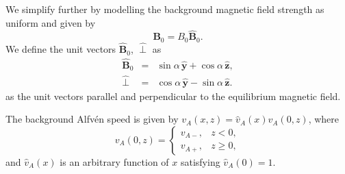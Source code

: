 \documentclass[linenumbers]{aastex63}
\let\vec\boldsymbol
\begin{document}
We simplify further by modelling the background magnetic field strength as uniform and given by
\begin{equation}
    \vec{B}_0 = B_0 \vec{\hat{B}}_0.
\end{equation}
We define the unit vectors $\vec{\hat{B}}_0$, $\vec{\hat{\perp}}$ as
\begin{eqnarray}
    \vec{\hat{B}}_0 & = & \sin\alpha\, \vec{\hat{y}} + \cos\alpha\, \vec{\hat{z}}, \\
    \vec{\hat{\perp}} & = & \cos\alpha\, \vec{\hat{y}} - \sin\alpha\, \vec{\hat{z}}.
\end{eqnarray}
as the unit vectors parallel and perpendicular to the equilibrium magnetic field.

The background Alfv\'en speed is given by $v_A(x,z) = \hat{v}_A(x)v_A(0,z)$, where
\begin{equation}
    \label{eq:alfven_speed_along_z}
    v_A(0,z) = \begin{cases}
    v_{A-}, & z < 0, \\
    v_{A+}, & z \ge 0,
    \end{cases}
\end{equation}
and $\hat{v}_A(x)$ is an arbitrary function of $x$ satisfying $\hat{v}_A(0)=1$.
\end{document}
